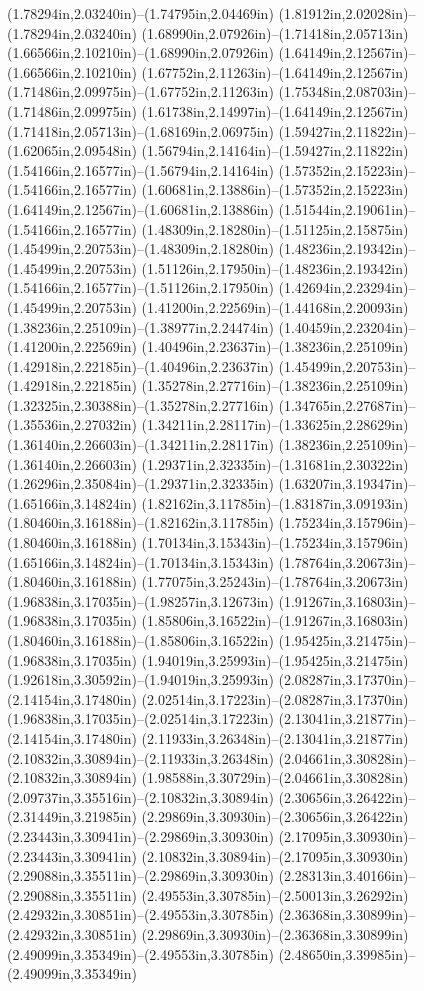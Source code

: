 (1.78294in,2.03240in)--(1.74795in,2.04469in) (1.81912in,2.02028in)--(1.78294in,2.03240in) (1.68990in,2.07926in)--(1.71418in,2.05713in) (1.66566in,2.10210in)--(1.68990in,2.07926in) (1.64149in,2.12567in)--(1.66566in,2.10210in) (1.67752in,2.11263in)--(1.64149in,2.12567in) (1.71486in,2.09975in)--(1.67752in,2.11263in) (1.75348in,2.08703in)--(1.71486in,2.09975in) (1.61738in,2.14997in)--(1.64149in,2.12567in) (1.71418in,2.05713in)--(1.68169in,2.06975in) (1.59427in,2.11822in)--(1.62065in,2.09548in) (1.56794in,2.14164in)--(1.59427in,2.11822in) (1.54166in,2.16577in)--(1.56794in,2.14164in) (1.57352in,2.15223in)--(1.54166in,2.16577in) (1.60681in,2.13886in)--(1.57352in,2.15223in) (1.64149in,2.12567in)--(1.60681in,2.13886in) (1.51544in,2.19061in)--(1.54166in,2.16577in) (1.48309in,2.18280in)--(1.51125in,2.15875in) (1.45499in,2.20753in)--(1.48309in,2.18280in) (1.48236in,2.19342in)--(1.45499in,2.20753in) (1.51126in,2.17950in)--(1.48236in,2.19342in) (1.54166in,2.16577in)--(1.51126in,2.17950in) (1.42694in,2.23294in)--(1.45499in,2.20753in) (1.41200in,2.22569in)--(1.44168in,2.20093in) (1.38236in,2.25109in)--(1.38977in,2.24474in) (1.40459in,2.23204in)--(1.41200in,2.22569in) (1.40496in,2.23637in)--(1.38236in,2.25109in) (1.42918in,2.22185in)--(1.40496in,2.23637in) (1.45499in,2.20753in)--(1.42918in,2.22185in) (1.35278in,2.27716in)--(1.38236in,2.25109in) (1.32325in,2.30388in)--(1.35278in,2.27716in) (1.34765in,2.27687in)--(1.35536in,2.27032in) (1.34211in,2.28117in)--(1.33625in,2.28629in) (1.36140in,2.26603in)--(1.34211in,2.28117in) (1.38236in,2.25109in)--(1.36140in,2.26603in) (1.29371in,2.32335in)--(1.31681in,2.30322in) (1.26296in,2.35084in)--(1.29371in,2.32335in) (1.63207in,3.19347in)--(1.65166in,3.14824in) (1.82162in,3.11785in)--(1.83187in,3.09193in) (1.80460in,3.16188in)--(1.82162in,3.11785in) (1.75234in,3.15796in)--(1.80460in,3.16188in) (1.70134in,3.15343in)--(1.75234in,3.15796in) (1.65166in,3.14824in)--(1.70134in,3.15343in) (1.78764in,3.20673in)--(1.80460in,3.16188in) (1.77075in,3.25243in)--(1.78764in,3.20673in) (1.96838in,3.17035in)--(1.98257in,3.12673in) (1.91267in,3.16803in)--(1.96838in,3.17035in) (1.85806in,3.16522in)--(1.91267in,3.16803in) (1.80460in,3.16188in)--(1.85806in,3.16522in) (1.95425in,3.21475in)--(1.96838in,3.17035in) (1.94019in,3.25993in)--(1.95425in,3.21475in) (1.92618in,3.30592in)--(1.94019in,3.25993in) (2.08287in,3.17370in)--(2.14154in,3.17480in) (2.02514in,3.17223in)--(2.08287in,3.17370in) (1.96838in,3.17035in)--(2.02514in,3.17223in) (2.13041in,3.21877in)--(2.14154in,3.17480in) (2.11933in,3.26348in)--(2.13041in,3.21877in) (2.10832in,3.30894in)--(2.11933in,3.26348in) (2.04661in,3.30828in)--(2.10832in,3.30894in) (1.98588in,3.30729in)--(2.04661in,3.30828in) (2.09737in,3.35516in)--(2.10832in,3.30894in) (2.30656in,3.26422in)--(2.31449in,3.21985in) (2.29869in,3.30930in)--(2.30656in,3.26422in) (2.23443in,3.30941in)--(2.29869in,3.30930in) (2.17095in,3.30930in)--(2.23443in,3.30941in) (2.10832in,3.30894in)--(2.17095in,3.30930in) (2.29088in,3.35511in)--(2.29869in,3.30930in) (2.28313in,3.40166in)--(2.29088in,3.35511in) (2.49553in,3.30785in)--(2.50013in,3.26292in) (2.42932in,3.30851in)--(2.49553in,3.30785in) (2.36368in,3.30899in)--(2.42932in,3.30851in) (2.29869in,3.30930in)--(2.36368in,3.30899in) (2.49099in,3.35349in)--(2.49553in,3.30785in) (2.48650in,3.39985in)--(2.49099in,3.35349in) 